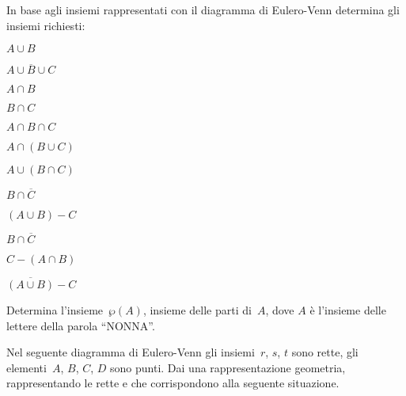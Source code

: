 \begin{esercizio}
\label{ese:7.90}
In base agli insiemi rappresentati con il diagramma di Eulero-Venn determina gli 
insiemi richiesti:
\begin{multicols}{2}
\begin{enumeratea}
\item $A\cup B$
\item $\overline{{A\cup B\cup C}}$
\item $A\cap B$
\item $B\cap C$
\item $A\cap B\cap C$
\item $A\cap (B\cup C)$
\item $A\cup (B\cap C)$
\item $B\cap \overline{C}$
\item $(A\cup B)-C$
\item $B\cap \overline{C}$
\item $C-(A\cap B)$
\item $\overline{{(A\cup B)}}-C$
\end{enumeratea}
\begin{center}
 
\end{center}
\end{multicols}
\end{esercizio}

\begin{multicols}{2}
\begin{esercizio}
\label{ese:7.91}
Determina l'insieme~$\wp(A)$, insieme delle parti di~$A$, dove $A$ è l'insieme 
delle lettere della parola ``NONNA''.
\end{esercizio}

\begin{esercizio}
\label{ese:7.92}
Nel seguente diagramma di Eulero-Venn gli insiemi~$r$, $s$, $t$
sono rette, gli elementi~$A$, $B$, $C$, $D$ sono punti. Dai una
rappresentazione geometria, rappresentando le rette e che corrispondono
alla seguente situazione.
\begin{center}
 
\end{center}
\end{esercizio}
\end{multicols}


